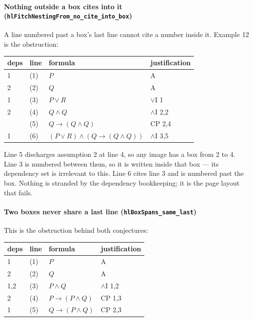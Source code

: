 \documentclass[11pt]{article}
\theoremstyle{plain}
\newcommand{\isa}[1]{\texttt{\small #1}}
\begin{document}
\paragraph{Nothing outside a box cites into it
\normalfont(\isa{hlFitchNestingFrom\_no\_cite\_into\_box})} A line numbered past
a box's last line cannot cite a number inside it. Example 12 is the
obstruction:

\begin{center}
\begin{tabular}{@{}llll@{}}
\toprule
deps & line & formula & justification \\
\midrule
1 & (1) & $P$                                        & A \\
2 & (2) & $Q$                                        & A \\
1 & (3) & $P \vee R$                                 & $\vee$I 1 \\
2 & (4) & $Q \wedge Q$                               & $\wedge$I 2,2 \\
  & (5) & $Q \to (Q \wedge Q)$                       & CP 2,4 \\
1 & (6) & $(P \vee R) \wedge (Q \to (Q \wedge Q))$   & $\wedge$I 3,5 \\
\bottomrule
\end{tabular}
\end{center}

\noindent
Line 5 discharges assumption 2 at line 4, so any image has a box from 2 to 4.
Line 3 is numbered between them, so it is written inside that box --- its
dependency set is irrelevant to this. Line 6 cites line 3 and is numbered past
the box. Nothing is stranded by the dependency bookkeeping; it is the page
layout that fails.

\paragraph{Two boxes never share a last line
\normalfont(\isa{hlBoxSpans\_same\_last})} This is the obstruction behind both
conjectures:

\begin{center}
\begin{tabular}{@{}llll@{}}
\toprule
deps & line & formula & justification \\
\midrule
1    & (1) & $P$                  & A \\
2    & (2) & $Q$                  & A \\
1,2  & (3) & $P \wedge Q$         & $\wedge$I 1,2 \\
2    & (4) & $P \to (P \wedge Q)$ & CP 1,3 \\
1    & (5) & $Q \to (P \wedge Q)$ & CP 2,3 \\
\bottomrule
\end{tabular}
\end{center}
\end{document}

